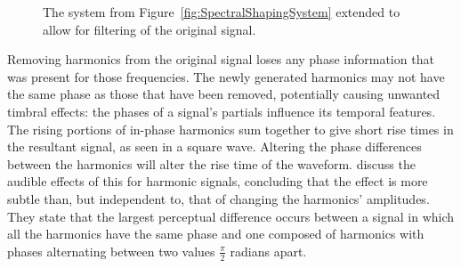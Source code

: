 \begin{figure}[h!]
			\caption{The system from Figure~\ref{fig:SpectralShapingSystem} extended to allow for filtering of
				 the original signal.}
			\label{fig:SuperpositionSystem}
		\end{figure}

		Removing harmonics from the original signal loses any phase information that was present for those
		frequencies. The newly generated harmonics may not have the same phase as those that have been removed,
		potentially causing unwanted timbral effects: the phases of a signal's partials influence its temporal
		features. The rising portions of in-phase harmonics sum together to give short rise times in the resultant
		signal, as seen in a square wave. Altering the phase differences between the harmonics will alter the rise
		time of the waveform. \citet{plomp1969effect} discuss the audible effects of this for harmonic signals,
		concluding that the effect is more subtle than, but independent to, that of changing the harmonics'
		amplitudes. They state that the largest perceptual difference occurs between a signal in which all the
		harmonics have the same phase and one composed of harmonics with phases alternating between two values
		$\frac{\pi}{2}$ radians apart.

